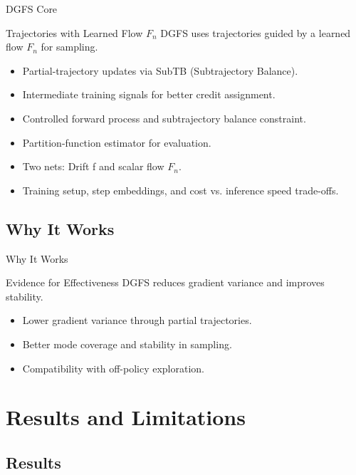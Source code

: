 \documentclass[aspectratio=169,xcolor=dvipsnames]{beamer}
\begin{document}
\begin{frame}{DGFS Core}
    \begin{block}{Trajectories with Learned Flow $F_n$}
        DGFS uses trajectories guided by a learned flow $F_n$ for sampling.
    \end{block}
    \begin{itemize}
        \item Partial-trajectory updates via SubTB (Subtrajectory Balance).
        \item Intermediate training signals for better credit assignment.
        \item Controlled forward process and subtrajectory balance constraint.
        \item Partition-function estimator for evaluation.
        \item Two nets: Drift f and scalar flow $F_n$.
        \item Training setup, step embeddings, and cost vs. inference speed trade-offs.
    \end{itemize}
\end{frame}

\subsection{Why It Works}

\begin{frame}{Why It Works}
    \begin{block}{Evidence for Effectiveness}
        DGFS reduces gradient variance and improves stability.
    \end{block}
    \begin{itemize}
        \item Lower gradient variance through partial trajectories.
        \item Better mode coverage and stability in sampling.
        \item Compatibility with off-policy exploration.
    \end{itemize}
\end{frame}

\section{Results and Limitations}

\subsection{Results}
\end{document}

